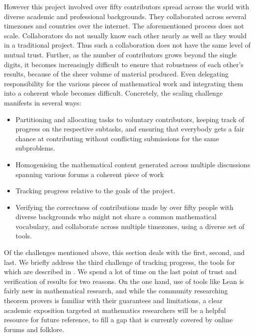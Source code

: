 However this project involved over fifty contributors spread across the world with diverse academic and professional backgrounds. They collaborated across several timezones and countries over the internet. The aforementioned process does not scale. Collaborators do not usually know each other nearly as well as they would in a traditional project. Thus such a collaboration does not have the same level of mutual trust. Further, as the number of contributors grows beyond the single digits, it becomes increasingly difficult to ensure that robustness of each other's results, because of the sheer volume of material produced. Even delegating responsibility for the various pieces of mathematical work and integrating them into a coherent whole becomes difficult. Concretely, the scaling challenge manifests in several ways:
\begin{itemize}
    \item Partitioning and allocating tasks to voluntary contributors, keeping track of progress on the respective subtasks, and ensuring that everybody gets a fair chance at contributing without conflicting submissions for the same subproblems.
    \item Homogenising the mathematical content generated across multiple discussions spanning various forums a coherent piece of work
    \item Tracking progress relative to the goals of the project.
    \item Verifying the correctness of contributions made by over fifty people with diverse backgrounds who might not share a common mathematical vocabulary, and collaborate across multiple timezones, using a diverse set of tools.
\end{itemize}

Of the challenges mentioned above, this section deals with the first, second, and last. We briefly address the third challenge of tracking progress, the tools for which are described in . We spend a lot of time on the last point of trust and verification of results for two reasons. On the one hand, use of tools like Lean is fairly new in mathematical research, and while the community researching theorem provers is familiar with their guarantees and limitations, a clear academic exposition targeted at mathematics researchers will be a helpful resource for future reference, to fill a gap that is currently covered by online forums and folklore.

